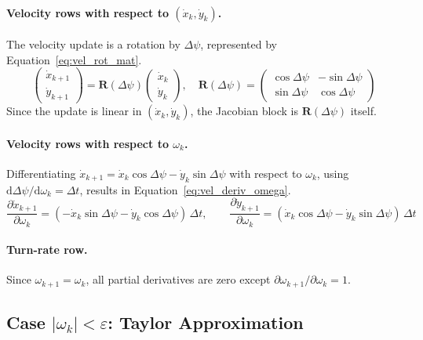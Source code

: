 \paragraph{Velocity rows with respect to $(\dot{x}_k, \dot{y}_k)$.}
The velocity update is a rotation by $\Delta\psi$, represented by Equation~\ref{eq:vel_rot_mat}.
\begin{equation}
    \begin{pmatrix}\dot{x}_{k+1}\\\dot{y}_{k+1}\end{pmatrix} = \mathbf{R}(\Delta\psi) \begin{pmatrix}\dot{x}_k\\\dot{y}_k\end{pmatrix}, \quad
    \mathbf{R}(\Delta\psi) = \begin{pmatrix}\cos\Delta\psi & -\sin\Delta\psi \\ \sin\Delta\psi &  \cos\Delta\psi\end{pmatrix}
    \label{eq:vel_rot_mat}
\end{equation}
Since the update is linear in $(\dot{x}_k, \dot{y}_k)$, the Jacobian block is
$\mathbf{R}(\Delta\psi)$ itself.

\paragraph{Velocity rows with respect to $\omega_k$.}
Differentiating $\dot{x}_{k+1} = \dot{x}_k\cos\Delta\psi - \dot{y}_k\sin\Delta\psi$
with respect to $\omega_k$, using $\mathrm{d}\Delta\psi/\mathrm{d}\omega_k = \Delta t$, results in Equation~\ref{eq:vel_deriv_omega}.
\begin{equation}
    \frac{\partial \dot{x}_{k+1}}{\partial \omega_k} =
    (-\dot{x}_k\sin\Delta\psi - \dot{y}_k\cos\Delta\psi)\,\Delta t, \qquad
    \frac{\partial \dot{y}_{k+1}}{\partial \omega_k} =
    (\dot{x}_k\cos\Delta\psi - \dot{y}_k\sin\Delta\psi)\,\Delta t
        \label{eq:vel_deriv_omega}
\end{equation}


\paragraph{Turn-rate row.}
Since $\omega_{k+1} = \omega_k$, all partial derivatives are zero except
$\partial\omega_{k+1}/\partial\omega_k = 1$.

\subsection*{Case $|\omega_k| < \varepsilon$: Taylor Approximation}

